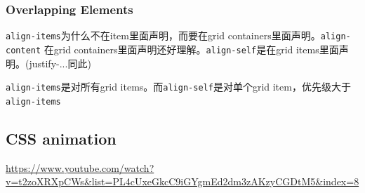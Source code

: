 \documentclass[a4paper, 12pt]{article}
\begin{document}
\subsubsection{Overlapping Elements}

\verb|align-items|为什么不在item里面声明，而要在grid containers里面声明。\verb|align-content| 在grid containers里面声明还好理解。\verb|align-self|是在grid items里面声明。(justify-...同此)

\verb|align-items|是对所有grid items。而\verb|align-self|是对单个grid item，优先级大于\verb|align-items|

\subsection{CSS animation}
\url{https://www.youtube.com/watch?v=t2zoXRXpCWs&list=PL4cUxeGkcC9iGYgmEd2dm3zAKzyCGDtM5&index=8}
\end{document}

